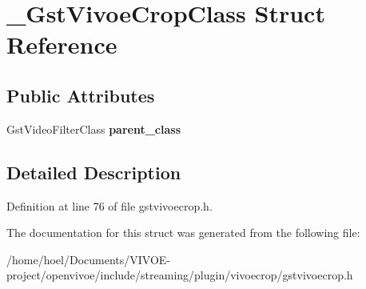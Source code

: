 \hypertarget{struct__GstVivoeCropClass}{}\section{\+\_\+\+Gst\+Vivoe\+Crop\+Class Struct Reference}
\label{struct__GstVivoeCropClass}
\subsection*{Public Attributes}
\begin{DoxyCompactItemize}
\item 
Gst\+Video\+Filter\+Class {\bfseries parent\+\_\+class}\hypertarget{struct__GstVivoeCropClass_a5bed8a77a172052d5b59068020fadcd5}{}\label{struct__GstVivoeCropClass_a5bed8a77a172052d5b59068020fadcd5}

\end{DoxyCompactItemize}


\subsection{Detailed Description}


Definition at line 76 of file gstvivoecrop.\+h.



The documentation for this struct was generated from the following file\+:\begin{DoxyCompactItemize}
\item 
/home/hoel/\+Documents/\+V\+I\+V\+O\+E-\/project/openvivoe/include/streaming/plugin/vivoecrop/gstvivoecrop.\+h\end{DoxyCompactItemize}

